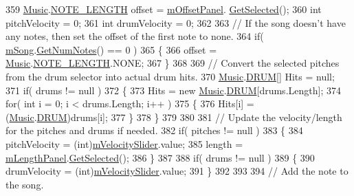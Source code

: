 \begin{DoxyCode}
359             \hyperlink{class_music}{Music}.\hyperlink{group___music_enums_gaf11b5f079adbb21c800b9eca1c5c3cbd}{NOTE\_LENGTH} offset = \hyperlink{group___s_c_m_priv_var_ga86a44007a4b127d7aa61f75dd34a3409}{mOffsetPanel}.
      \hyperlink{group___s_c_m_nest_class_ae73f2b2c2f567ecaf6ce10f85c30956a}{GetSelected}();
360             \textcolor{keywordtype}{int} pitchVelocity = 0;
361             \textcolor{keywordtype}{int} drumVelocity = 0;
362 
363             \textcolor{comment}{// If the song doesn't have any notes, then set the offset of the first note to none.}
364             \textcolor{keywordflow}{if}( \hyperlink{group___s_c_m_priv_var_gabd8329149faef65a689650d951a9abc9}{mSong}.\hyperlink{group___song_pub_func_gad124d0af146885327f8ac455bc013b63}{GetNumNotes}() == 0 )
365             \{
366                 offset = \hyperlink{class_music}{Music}.\hyperlink{group___music_enums_gaf11b5f079adbb21c800b9eca1c5c3cbd}{NOTE\_LENGTH}.NONE;
367             \}
368 
369             \textcolor{comment}{// Convert the selected pitches from the drum selector into actual drum hits.}
370             \hyperlink{class_music}{Music}.\hyperlink{group___music_enums_gade475b4382c7066d1af13e7c13c029b6}{DRUM}[] Hits = null;
371             \textcolor{keywordflow}{if}( drums != null )
372             \{
373                 Hits = \textcolor{keyword}{new} \hyperlink{class_music}{Music}.\hyperlink{group___music_enums_gade475b4382c7066d1af13e7c13c029b6}{DRUM}[drums.Length];
374                 \textcolor{keywordflow}{for}( \textcolor{keywordtype}{int} i = 0; i < drums.Length; i++ )
375                 \{
376                     Hits[i] = (\hyperlink{class_music}{Music}.\hyperlink{group___music_enums_gade475b4382c7066d1af13e7c13c029b6}{DRUM})drums[i];
377                 \}
378             \}
379 
380 
381             \textcolor{comment}{// Update the velocity/length for the pitches and drums if needed.}
382             \textcolor{keywordflow}{if}( pitches != null )
383             \{
384                 pitchVelocity = (int)\hyperlink{group___s_c_m_priv_var_ga7316e5e8f15d1574fc6cb4bd739bbf0a}{mVelocitySlider}.value;
385                 length = \hyperlink{group___s_c_m_priv_var_gadb8dedf80fbe474a1c94cdc95d088a6f}{mLengthPanel}.\hyperlink{group___s_c_m_nest_class_ae73f2b2c2f567ecaf6ce10f85c30956a}{GetSelected}();
386             \}
387 
388             \textcolor{keywordflow}{if}( drums != null )
389             \{
390                 drumVelocity = (int)\hyperlink{group___s_c_m_priv_var_ga7316e5e8f15d1574fc6cb4bd739bbf0a}{mVelocitySlider}.value;
391             \}
392 
393 
394             \textcolor{comment}{// Add the note to the song.}

\end{DoxyCode}
